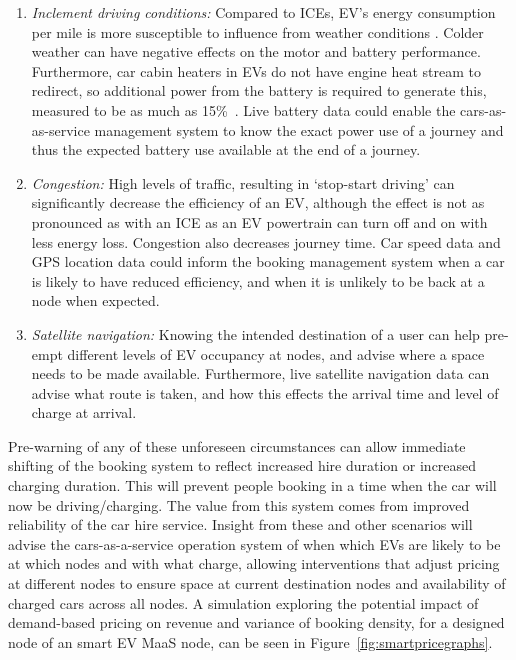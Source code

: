 \documentclass[journal]{IEEEtran}
\begin{document}
\begin{enumerate}
\item {\emph{Inclement driving conditions:}} Compared to ICEs, EV’s
energy consumption per mile is more susceptible to influence from
weather conditions . Colder weather can have negative effects on the
motor and battery performance. Furthermore, car cabin heaters in EVs 
do not have engine heat stream to redirect, so additional power
from the battery is required to generate this, measured to be as much
as 15\%~\cite{dft:2008}. Live battery data could enable the
cars-as-as-service management system to know the exact power use of a
journey and thus the expected battery use available at the end of a
journey.
\item {\emph{Congestion:}} High levels of traffic, resulting in
`stop-start driving’ can significantly decrease the efficiency of an
EV, although the effect is not as pronounced as with an ICE as an EV
powertrain can turn off and on with less energy loss. Congestion also
decreases journey time. Car speed data and GPS location data could
inform the booking management system when a car is likely to have
reduced efficiency, and when it is unlikely to be back at a node when
expected.
\item {\emph{Satellite navigation:}} Knowing the intended destination
of a user can help pre-empt different levels of EV occupancy at nodes,
and advise where a space needs to be made available. Furthermore, live
satellite navigation data can advise what route is taken, and how this
effects the arrival time and level of charge at arrival.
\end{enumerate}

Pre-warning of any of these unforeseen circumstances can allow
immediate shifting of the booking system to reflect increased hire
duration or increased charging duration. This will prevent people
booking in a time when the car will now be driving/charging. The value
from this system comes from improved reliability of the car hire
service.  Insight from these and other scenarios will advise the
cars-as-a-service operation system of when which EVs are likely to be
at which nodes and with what charge, allowing interventions that
adjust pricing at different nodes to ensure space at current
destination nodes and availability of charged cars across all nodes.
A simulation exploring the potential impact of demand-based pricing on
revenue and variance of booking density, for a designed node of an
smart EV MaaS node, can be seen in Figure~\ref{fig:smartpricegraphs}.
\end{document}
